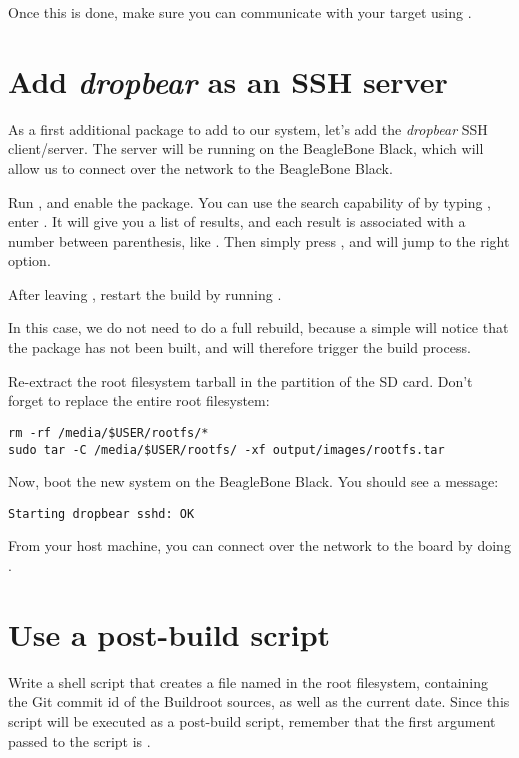 Once this is done, make sure you can communicate with your target
using .

\section{Add {\em dropbear} as an SSH server}

As a first additional package to add to our system, let's add the {\em
dropbear} SSH client/server. The server will be running on the
BeagleBone Black, which will allow us to connect over the network to
the BeagleBone Black.

Run , and enable the 
package. You can use the search capability of  by
typing \code{/}, enter . It will give you a list of
results, and each result is associated with a number between
parenthesis, like . Then simply press , and
 will jump to the right option.

After leaving , restart the build by running
.

In this case, we do not need to do a full rebuild, because a simple
 will notice that the  package has not been
built, and will therefore trigger the build process.

Re-extract the root filesystem tarball in the  partition
of the SD card. Don't forget to replace the entire root filesystem:

\begin{verbatim}
rm -rf /media/$USER/rootfs/*
sudo tar -C /media/$USER/rootfs/ -xf output/images/rootfs.tar
\end{verbatim}

Now, boot the new system on the BeagleBone Black. You should see a
message:

\begin{verbatim}
Starting dropbear sshd: OK
\end{verbatim}

From your host machine, you can connect over the network to the board
by doing .

\section{Use a post-build script}

Write a shell script that creates a file named  in
the root filesystem, containing the Git commit id of the Buildroot
sources, as well as the current date. Since this script will be
executed as a post-build script, remember that the first argument
passed to the script is .

